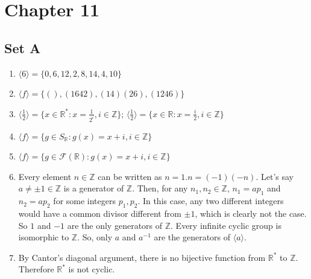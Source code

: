 \documentclass{article}
\newcommand{\angled}[1]{\langle#1\rangle}
\begin{document}
\section{Chapter 11}
\subsection{Set A}
\begin{enumerate}
    \item $ \angled{6} = \{0, 6, 12, 2, 8, 14, 4, 10\} $

    \item $ \angled{f} =  \{(), (1642), (14)(26), (1246)\} $

    \item $ \angled{\frac{1}{2}} = \{x \in \mathbb{R}^* : x = \frac{1}{2^i},  i \in \mathbb{Z} \} $; $ \angled{\frac{1}{2}} = \{x \in \mathbb{R} : x = \frac{i}{2}, i \in \mathbb{Z}\}$

    \item $ \angled{f} = \{g \in S_\mathbb{R} : g(x) = x + i, i \in \mathbb{Z}\} $

    \item $ \angled{f} = \{g \in \mathscr{F}(\mathbb{R}) : g(x) = x + i, i \in \mathbb{Z}\} $

    \item Every element $ n \in \mathbb{Z} $ can be written as $ n = 1.n = (-1)(-n) $. Let's say $ a \ne \pm 1 \in \mathbb{Z} $ is a generator of $ \mathbb{Z} $. Then, for any $ n_1, n_2 \in \mathbb{Z} $, $ n_1 = ap_1 $ and $ n_2 = ap_2 $ for some integers $ p_1, p_2 $. In this case, any two different integers would have a common divisor different from $ \pm 1 $, which is clearly not the case. So $ 1 $ and $ -1 $ are the only generators of $ \mathbb{Z} $. Every infinite cyclic group is isomorphic to $ \mathbb{Z} $. So, only $ a $ and $ a^{-1} $ are the generators of $ \angled{a} $.

    \item By Cantor's diagonal argument, there is no bijective function from $ \mathbb{R^*} $ to $ \mathbb{Z} $. Therefore $ \mathbb{R^*} $ is not cyclic.
\end{enumerate}
\end{document}
